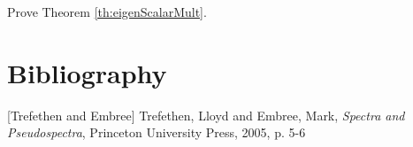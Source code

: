 \documentclass{ximera}
\begin{document}
\begin{problem}\label{prob:prob:eigenScalarMult}
    Prove Theorem \ref{th:eigenScalarMult}.
\end{problem}

\section*{Bibliography}
[Trefethen and  Embree] Trefethen, Lloyd and Embree, Mark, {\it Spectra and Pseudospectra}, Princeton University Press, 2005, p. 5-6
\end{document}
